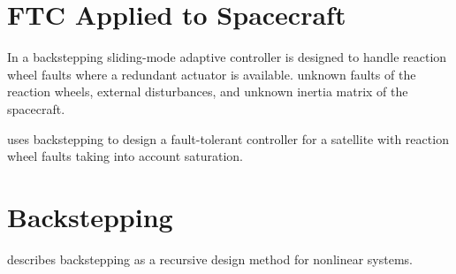 \section{FTC Applied to Spacecraft}
In \cite{jiangAdaptiveBacksteppingFaulttolerant2010} a backstepping sliding-mode adaptive controller is designed to handle reaction wheel faults where a 
redundant actuator is available. unknown faults of the reaction wheels, external disturbances, and unknown
inertia matrix of the spacecraft. 

\cite{shenActiveFaulttolerantControl2019} uses backstepping to design a fault-tolerant controller for a satellite with reaction wheel faults taking into
account saturation.

\section{Backstepping}
\cite{khalilNonlinearSystems2002} describes backstepping as a recursive design method for nonlinear systems.
